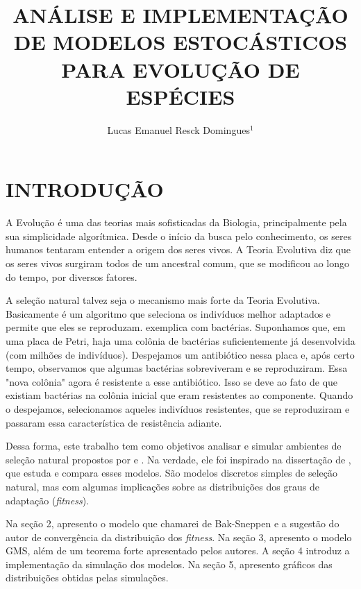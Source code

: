 \documentclass[10pt,brazil,english]{article}
\title{ANÁLISE E IMPLEMENTAÇÃO DE MODELOS ESTOCÁSTICOS PARA EVOLUÇÃO DE ESPÉCIES}
\author{Lucas Emanuel Resck Domingues$^{1}$}
\begin{document}
    \pagestyle{fancy} %
    
    \maketitle
    \newpage

    \newtheorem{theorem}{Teorema}
    
    \section{INTRODUÇÃO}

        A Evolução é uma das teorias mais sofisticadas da Biologia, principalmente pela sua simplicidade algorítmica.
        Desde o início da busca pelo conhecimento, os seres humanos tentaram entender a origem dos seres vivos.
        A Teoria Evolutiva diz que os seres vivos surgiram todos de um ancestral comum, que se modificou ao longo do tempo, por diversos fatores.
        
        A seleção natural talvez seja o mecanismo mais forte da Teoria Evolutiva.
        Basicamente é um algoritmo que seleciona os indivíduos melhor adaptados e permite que eles se reproduzam.
         exemplica com bactérias. Suponhamos que, em uma placa de Petri, haja uma colônia de bactérias suficientemente já desenvolvida (com milhões de indivíduos).
        Despejamos um antibiótico nessa placa e, após certo tempo, observamos que algumas bactérias sobreviveram e se reproduziram.
        Essa "nova colônia" \space agora é resistente a esse antibiótico.
        Isso se deve ao fato de que existiam bactérias na colônia inicial que eram resistentes ao componente.
        Quando o despejamos, selecionamos aqueles indivíduos resistentes, que se reproduziram e passaram essa característica de resistência adiante.

        Dessa forma, este trabalho tem como objetivos analisar e simular ambientes de seleção natural propostos por  e .
        Na verdade, ele foi inspirado na dissertação de , que estuda e compara esses modelos.
        São modelos discretos simples de seleção natural, mas com algumas implicações sobre as distribuições dos graus de adaptação (\textit{fitness}).

        Na seção 2, apresento o modelo que chamarei de Bak-Sneppen e a sugestão do autor de convergência da distribuição dos \textit{fitness}.
        Na seção 3, apresento o modelo GMS, além de um teorema forte apresentado pelos autores.
        A seção 4 introduz a implementação da simulação dos modelos.
        Na seção 5, apresento gráficos das distribuições obtidas pelas simulações.
        
\end{document}
